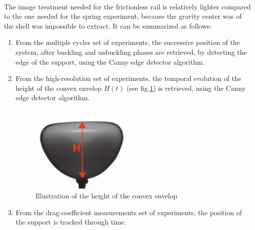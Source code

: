 \paragraph{}
The image treatment needed for the frictionless rail is relatively lighter compared to the one needed for the spring experiment, because the gravity center was of the shell was impossible to extract. It can be summarized as follows:
\begin{enumerate}
		
	\item From the multiple cycles set of experiments, the successive position of the system, after buckling and unbuckling phases are retrieved, by detecting the edge of the support, using the Canny edge detector algorithm.
	
	\item From the high-resolution set of experiments, the temporal evolution of the height of the convex envelop $H(t)$ (see fig.\ref{fig:h_t}) is retrieved, using the Canny edge detector algorithm.
	\begin{figure}[H] %
	\centering%
	\includegraphics[width=0.48\textwidth]{figures/Chapter_1/h.pdf}
	\caption{Illustration of the height of the convex envelop}
	\label{fig:h_t}
\end{figure}
	\item From the drag-coefficient measurements set of experiments, the position of the support is tracked through time.
\end{enumerate}
